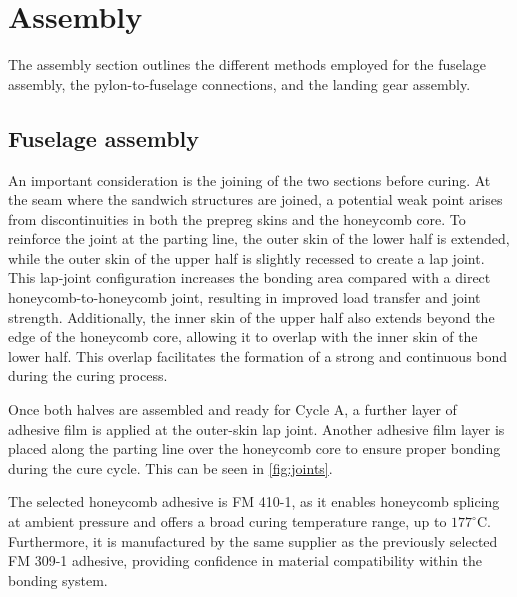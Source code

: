 \section{Assembly}
\label{sec:assembly}

The assembly section outlines the different methods employed for the fuselage assembly, the pylon-to-fuselage connections, and the landing gear assembly.

\subsection{Fuselage assembly}
\label{sub:fuselage_assembly}

An important consideration is the joining of the two sections before curing. At the seam where the sandwich structures are joined, a potential weak point arises from discontinuities in both the prepreg skins and the honeycomb core. To reinforce the joint at the parting line, the outer skin of the lower half is extended, while the outer skin of the upper half is slightly recessed to create a lap joint. This lap-joint configuration increases the bonding area compared with a direct honeycomb-to-honeycomb joint, resulting in improved load transfer and joint strength. Additionally, the inner skin of the upper half also extends beyond the edge of the honeycomb core, allowing it to overlap with the inner skin of the lower half. This overlap facilitates the formation of a strong and continuous bond during the curing process. %

Once both halves are assembled and ready for Cycle A, a further layer of adhesive film is applied at the outer-skin lap joint. Another adhesive film layer is placed along the parting line over the honeycomb core to ensure proper bonding during the cure cycle. This can be seen in \autoref{fig:joints}.

The selected honeycomb adhesive is FM 410-1, as it enables honeycomb splicing at ambient pressure and offers a broad curing temperature range, up to $177^{\circ}$C. Furthermore, it is manufactured by the same supplier as the previously selected FM 309-1 adhesive, providing confidence in material compatibility within the bonding system.

